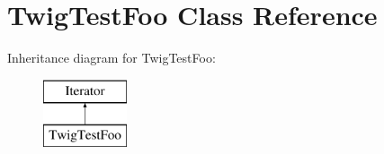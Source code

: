 \hypertarget{classTwigTestFoo}{}\section{Twig\+Test\+Foo Class Reference}
\label{classTwigTestFoo}
Inheritance diagram for Twig\+Test\+Foo\+:\begin{figure}[H]
\begin{center}
\leavevmode
\includegraphics[height=2.000000cm]{classTwigTestFoo}
\end{center}
\end{figure}
